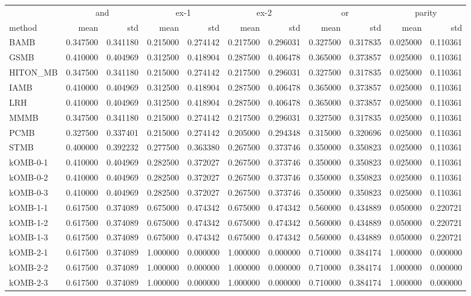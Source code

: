 \begin{tabular}{lrrrrrrrrrr}
\toprule
{} & \multicolumn{2}{c}{and} & \multicolumn{2}{c}{ex-1} & \multicolumn{2}{c}{ex-2} & \multicolumn{2}{c}{or} & \multicolumn{2}{c}{parity} \\
method & mean & std & mean & std & mean & std & mean & std & mean & std \\
\midrule
BAMB & 0.347500 & 0.341180 & 0.215000 & 0.274142 & 0.217500 & 0.296031 & 0.327500 & 0.317835 & 0.025000 & 0.110361 \\
GSMB & 0.410000 & 0.404969 & 0.312500 & 0.418904 & 0.287500 & 0.406478 & 0.365000 & 0.373857 & 0.025000 & 0.110361 \\
HITON\_MB & 0.347500 & 0.341180 & 0.215000 & 0.274142 & 0.217500 & 0.296031 & 0.327500 & 0.317835 & 0.025000 & 0.110361 \\
IAMB & 0.410000 & 0.404969 & 0.312500 & 0.418904 & 0.287500 & 0.406478 & 0.365000 & 0.373857 & 0.025000 & 0.110361 \\
LRH & 0.410000 & 0.404969 & 0.312500 & 0.418904 & 0.287500 & 0.406478 & 0.365000 & 0.373857 & 0.025000 & 0.110361 \\
MMMB & 0.347500 & 0.341180 & 0.215000 & 0.274142 & 0.217500 & 0.296031 & 0.327500 & 0.317835 & 0.025000 & 0.110361 \\
PCMB & 0.327500 & 0.337401 & 0.215000 & 0.274142 & 0.205000 & 0.294348 & 0.315000 & 0.320696 & 0.025000 & 0.110361 \\
STMB & 0.400000 & 0.392232 & 0.277500 & 0.363380 & 0.267500 & 0.373746 & 0.350000 & 0.350823 & 0.025000 & 0.110361 \\
kOMB-0-1 & 0.410000 & 0.404969 & 0.282500 & 0.372027 & 0.267500 & 0.373746 & 0.350000 & 0.350823 & 0.025000 & 0.110361 \\
kOMB-0-2 & 0.410000 & 0.404969 & 0.282500 & 0.372027 & 0.267500 & 0.373746 & 0.350000 & 0.350823 & 0.025000 & 0.110361 \\
kOMB-0-3 & 0.410000 & 0.404969 & 0.282500 & 0.372027 & 0.267500 & 0.373746 & 0.350000 & 0.350823 & 0.025000 & 0.110361 \\
kOMB-1-1 & 0.617500 & 0.374089 & 0.675000 & 0.474342 & 0.675000 & 0.474342 & 0.560000 & 0.434889 & 0.050000 & 0.220721 \\
kOMB-1-2 & 0.617500 & 0.374089 & 0.675000 & 0.474342 & 0.675000 & 0.474342 & 0.560000 & 0.434889 & 0.050000 & 0.220721 \\
kOMB-1-3 & 0.617500 & 0.374089 & 0.675000 & 0.474342 & 0.675000 & 0.474342 & 0.560000 & 0.434889 & 0.050000 & 0.220721 \\
kOMB-2-1 & 0.617500 & 0.374089 & 1.000000 & 0.000000 & 1.000000 & 0.000000 & 0.710000 & 0.384174 & 1.000000 & 0.000000 \\
kOMB-2-2 & 0.617500 & 0.374089 & 1.000000 & 0.000000 & 1.000000 & 0.000000 & 0.710000 & 0.384174 & 1.000000 & 0.000000 \\
kOMB-2-3 & 0.617500 & 0.374089 & 1.000000 & 0.000000 & 1.000000 & 0.000000 & 0.710000 & 0.384174 & 1.000000 & 0.000000 \\
\bottomrule
\end{tabular}
